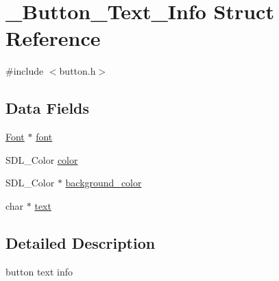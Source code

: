 \hypertarget{struct___button___text___info}{\section{\+\_\+\+Button\+\_\+\+Text\+\_\+\+Info Struct Reference}
\label{struct___button___text___info}
}


{\ttfamily \#include $<$button.\+h$>$}

\subsection*{Data Fields}
\begin{DoxyCompactItemize}
\item 
\hyperlink{sdl__font_8h_ae46a84f424fb0ff6b8650f3a09014880}{Font} $\ast$ \hyperlink{struct___button___text___info_a7cd87b1eaeb9bdee7ac16121086be6b8}{font}
\item 
S\+D\+L\+\_\+\+Color \hyperlink{struct___button___text___info_a631bf4babe4c1825a2cdc0c19c2bd04f}{color}
\item 
S\+D\+L\+\_\+\+Color $\ast$ \hyperlink{struct___button___text___info_a32aa566db158516db085c8abc793cf33}{background\+\_\+color}
\item 
char $\ast$ \hyperlink{struct___button___text___info_a5633b1433389cec21ade3811bbe9ca5b}{text}
\end{DoxyCompactItemize}


\subsection{Detailed Description}
button text info 

